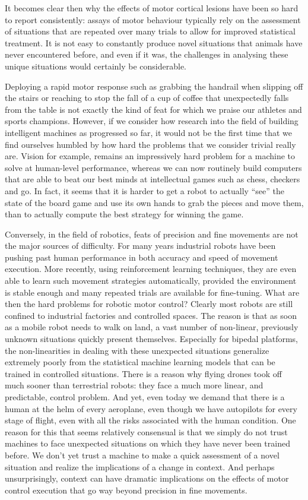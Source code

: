 It becomes clear then why the effects of motor cortical lesions have been so hard to report consistently: assays of motor behaviour typically rely on the assessment of situations that are repeated over many trials to allow for improved statistical treatment. It is not easy to constantly produce novel situations that animals have never encountered before, and even if it was, the challenges in analysing these unique situations would certainly be considerable.

Deploying a rapid motor response such as grabbing the handrail when slipping off the stairs or reaching to stop the fall of a cup of coffee that unexpectedly falls from the table is not exactly the kind of feat for which we praise our athletes and sports champions. However, if we consider how research into the field of building intelligent machines as progressed so far, it would not be the first time that we find ourselves humbled by how hard the problems that we consider trivial really are. Vision for example, remains an impressively hard problem for a machine to solve at human-level performance, whereas we can now routinely build computers that are able to beat our best minds at intellectual games such as chess, checkers and go. In fact, it seems that it is harder to get a robot to actually ``see'' the state of the board game and use its own hands to grab the pieces and move them, than to actually compute the best strategy for winning the game.

Conversely, in the field of robotics, feats of precision and fine movements are not the major sources of difficulty. For many years industrial robots have been pushing past human performance in both accuracy and speed of movement execution. More recently, using reinforcement learning techniques, they are even able to learn such movement strategies automatically, provided the environment is stable enough and many repeated trials are available for fine-tuning. What are then the hard problems for robotic motor control? Clearly most robots are still confined to industrial factories and controlled spaces. The reason is that as soon as a mobile robot needs to walk on land, a vast number of non-linear, previously unknown situations quickly present themselves. Especially for bipedal platforms, the non-linearities in dealing with these unexpected situations generalize extremely poorly from the statistical machine learning models that can be trained in controlled situations. There is a reason why flying drones took off much sooner than terrestrial robots: they face a much more linear, and predictable, control problem. And yet, even today we demand that there is a human at the helm of every aeroplane, even though we have autopilots for every stage of flight, even with all the risks associated with the human condition. One reason for this that seems relatively consensual is that we simply do not trust machines to face unexpected situations on which they have never been trained before. We don't yet trust a machine to make a quick assessment of a novel situation and realize the implications of a change in context. And perhaps unsurprisingly, context can have dramatic implications on the effects of motor control execution that go way beyond precision in fine movements.

